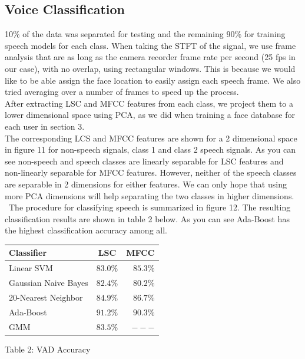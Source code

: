 \documentclass{article}
\begin{document}
\subsection{Voice Classification}
10\% of the data was separated for testing and the remaining 90\% for training speech models for each class. When taking the STFT of the signal, we use frame analysis that are as long as the camera recorder frame rate per second (25 fps in our case), with no overlap, using rectangular windows. This is because we would like to be able assign the face location to easily assign each speech frame. We also tried averaging over a number of frames to speed up the process.\\
After extracting LSC and MFCC features from each class, we project them to a lower dimensional space using PCA, as we did when training a face database for each user in section 3. \\
The corresponding LCS and MFCC features are shown for a 2 dimensional space in figure 11 for non-speech signals, class 1 and class 2 speech signals.
As you can see non-speech and speech classes are linearly separable for LSC features and non-linearly separable for MFCC features. However, neither of the speech classes are separable in 2 dimensions for either features. We can only hope that using more PCA dimensions will help separating the two classes in higher dimensions. 
\ The procedure for classifying speech is summarized in figure 12. The resulting classification results are shown in table 2 below. As you can see Ada-Boost has the highest classification accuracy among all.
\begin{center}
\begin{tabular}{ | l|c | r| }
\hline
Classifier & LSC & MFCC \\ \hline
Linear SVM & $83.0\%$ & $85.3\%$ \\ \hline
Gaussian Naive Bayes & $82.4\%$ & $80.2\%$ \\ \hline
20-Nearest Neighbor & $84.9\%$ & $ 86.7\%$ \\ \hline
Ada-Boost & $91.2\%$ & $ 90.3\%$ \\ \hline
GMM & $83.5\%$ & $---$\\ \hline
\end{tabular}
\end{center}\centerline{Table 2: VAD Accuracy}
\end{document}
